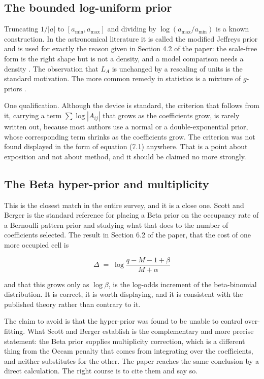\subsection{The bounded log-uniform prior}

Truncating $1 / |a|$ to $[a_{\min}, a_{\max}]$ and dividing by
$\log (a_{\max} / a_{\min})$ is a known construction. In the astronomical
literature it is called the modified Jeffreys prior and is used for exactly the
reason given in Section 4.2 of the paper: the scale-free form is the right shape
but is not a density, and a model comparison needs a density \cite{feroz2011}. The
observation that $L_{A}$ is unchanged by a rescaling of units is the standard
motivation. The more common remedy in statistics is a mixture of $g$-priors
\cite{liang2008}.

One qualification. Although the device is standard, the criterion that follows from
it, carrying a term $\sum \log |A_{ij}|$ that grows as the coefficients grow, is
rarely written out, because most authors use a normal or a double-exponential
prior, whose corresponding term shrinks as the coefficients grow. The criterion was
not found displayed in the form of equation (7.1) anywhere. That is a point about
exposition and not about method, and it should be claimed no more strongly.

\subsection{The Beta hyper-prior and multiplicity}

This is the closest match in the entire survey, and it is a close one. Scott and
Berger \cite{scott2010} is the standard reference for placing a Beta prior on the
occupancy rate of a Bernoulli pattern prior and studying what that does to the
number of coefficients selected. The result in Section 6.2 of the paper, that the
cost of one more occupied cell is

\begin{equation}
\Delta \;=\; \log \frac{q - M - 1 + \beta}{M + \alpha}
\label{eq:increment}
\end{equation}

and that this grows only as $\log \beta$, is the log-odds increment of the
beta-binomial distribution. It is correct, it is worth displaying, and it is
consistent with the published theory rather than contrary to it.

The claim to avoid is that the hyper-prior was found to be unable to control
over-fitting. What Scott and Berger establish is the complementary and more precise
statement: the Beta prior supplies multiplicity correction, which is a different
thing from the Occam penalty that comes from integrating over the coefficients, and
neither substitutes for the other. The paper reaches the same conclusion by a
direct calculation. The right course is to cite them and say so.

